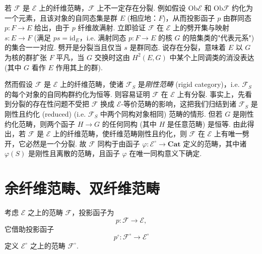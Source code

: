 若 $\mathcal{F}$ 是 $\mathcal{E}$ 上的纤维范畴，$\mathcal{F}$ 上不一定存在分裂. 例如假设 $\mathrm{Ob} \mathcal{E}$ 和 $\mathrm{Ob} \mathcal{F}$ 约化为一个元素，且该对象的自同态集是群 $E$ (相应地：$F$)，从而投影函子 $p$ 由群同态 $p \colon F \to E$ 给出，由于 $p$ 纤维故满射. 立即验证 $\mathcal{F}$ 在 $\mathcal{E}$ 上的劈开集与映射 $s \colon E \to F$ (满足 $ps = \mathrm{id}_E$，i.e. 满射同态 $p \colon F \to E$ 的核 $G$ 的陪集类的"代表元系") 的集合一一对应. 劈开是分裂当且仅当 $s$ 是群同态. 说存在分裂，意味着 $E$ 以 $G$ 为核的群扩张 $F$ 平凡，当 $G$ 交换时这由 $H^2(E, G)$ 中某个上同调类的消没表达 (其中 $G$ 看作 $E$ 作用其上的群).

然而假设 $\mathcal{F}$ 是 $\mathcal{E}$ 上的纤维范畴，使诸 $\mathcal{F}_S$ 是\emph{刚性范畴} (rigid category)，i.e. $\mathcal{F}_S$ 的每个对象的自同构群约化为恒等. 则容易证明 $\mathcal{F}$ 在 $\mathcal{E}$ 上有分裂. 事实上，先看到分裂的存在性问题不受把 $\mathcal{F}$ 换成 $\mathcal{E}$-等价范畴的影响，这把我们归结到诸 $\mathcal{F}_S$ 是刚性且约化 (reduced) (i.e. $\mathcal{F}_S$ 中两个同构对象相同) 范畴的情形. 但若 $G$ 是刚性约化范畴，则两个函子 $H \to G$ 的任何同构 (其中 $H$ 是任意范畴) 是恒等. 由此得出，若 $\mathcal{F}$ 是 $\mathcal{E}$ 上的纤维范畴，使纤维范畴刚性且约化，则 $\mathcal{F}$ 在 $\mathcal{E}$ 上有唯一劈开，它必然是一个分裂. 故 $\mathcal{F}$ 同构于由函子 $\varphi \colon \mathcal{E}^{\circ} \longrightarrow \mathbf{Cat}$ 定义的范畴，其中诸 $\varphi(S)$ 是刚性且离散的范畴，且函子 $\varphi$ 在唯一同构意义下确定.

\section{余纤维范畴、双纤维范畴}

考虑 $\mathcal{E}$ 之上的范畴 $\mathcal{F}$，投影函子为
\[
p \colon \mathcal{F} \longrightarrow \mathcal{E},
\]
它借助投影函子
\[
p^{\circ} \colon \mathcal{F}^{\circ} \longrightarrow \mathcal{E}^{\circ}
\]
定义 $\mathcal{E}^{\circ}$ 之上的范畴 $\mathcal{F}^{\circ}$.

